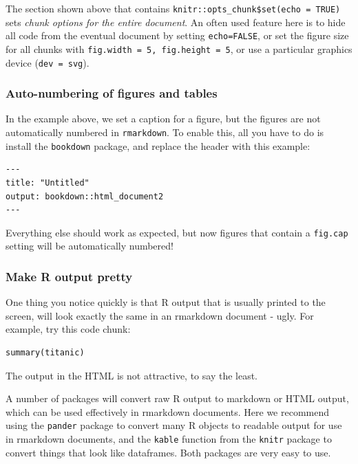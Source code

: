 \documentclass[]{book}
\begin{document}
The section shown above that contains \texttt{knitr::opts\_chunk\$set(echo\ =\ TRUE)} sets \emph{chunk options for the entire document}. An often used feature here is to hide all code from the eventual document by setting \texttt{echo=FALSE}, or set the figure size for all chunks with \texttt{fig.width\ =\ 5,\ fig.height\ =\ 5}, or use a particular graphics device (\texttt{dev\ =\ \textquotesingle{}svg\textquotesingle{}}).

\hypertarget{auto-numbering-of-figures-and-tables}{%
\subsubsection*{Auto-numbering of figures and tables}\label{auto-numbering-of-figures-and-tables}}

In the example above, we set a caption for a figure, but the figures are not automatically numbered in \texttt{rmarkdown}. To enable this, all you have to do is install the \texttt{bookdown} package, and replace the header with this example:

\begin{verbatim}
---
title: "Untitled"
output: bookdown::html_document2
---
\end{verbatim}

Everything else should work as expected, but now figures that contain a \texttt{fig.cap} setting will be automatically numbered!

\hypertarget{make-r-output-pretty}{%
\subsubsection*{Make R output pretty}\label{make-r-output-pretty}}

One thing you notice quickly is that R output that is usually printed to the screen, will look exactly the same in an rmarkdown document - ugly. For example, try this code chunk:

\begin{verbatim}
summary(titanic) 
\end{verbatim}

The output in the HTML is not attractive, to say the least.

A number of packages will convert raw R output to markdown or HTML output, which can be used effectively in rmarkdown documents. Here we recommend using the \texttt{pander} package to convert many R objects to readable output for use in rmarkdown documents, and the \texttt{kable} function from the \texttt{knitr} package to convert things that look like dataframes. Both packages are very easy to use.
\end{document}
